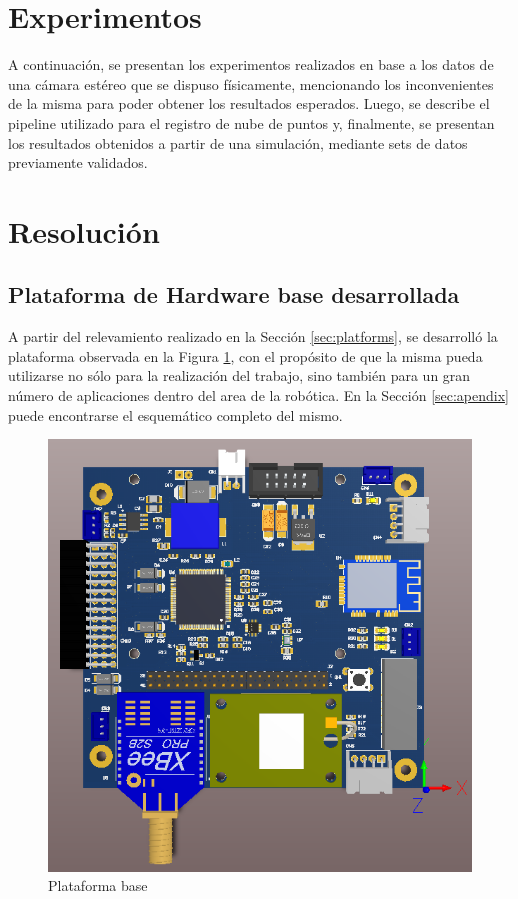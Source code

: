 \ifimagenes
\section{Experimentos}
A continuación, se presentan los experimentos realizados en base a los datos de una cámara estéreo que se dispuso físicamente, mencionando los inconvenientes de la misma para poder obtener los resultados esperados. Luego, se describe el pipeline utilizado para el registro de nube de puntos y, finalmente, se presentan los resultados obtenidos a partir de una simulación, mediante sets de datos previamente validados.
\else
\section{Resolución}
\subsection{Plataforma de Hardware base desarrollada}
A partir del relevamiento realizado en la Sección \ref{sec:platforms}, se desarrolló la plataforma observada en la Figura \ref{fig:baseboardv2_1}, con el propósito de que la misma pueda utilizarse no sólo para la realización del trabajo, sino también para un gran número de aplicaciones dentro del area de la robótica. En la Sección \ref{sec:apendix} puede encontrarse el esquemático completo del mismo.

\begin{figure}[!ht]
    \centering
    \includegraphics[width=\textwidth]{Img/BaseBoardV2_1.png}
    \caption{Plataforma base}
    \label{fig:baseboardv2_1}
\end{figure}

